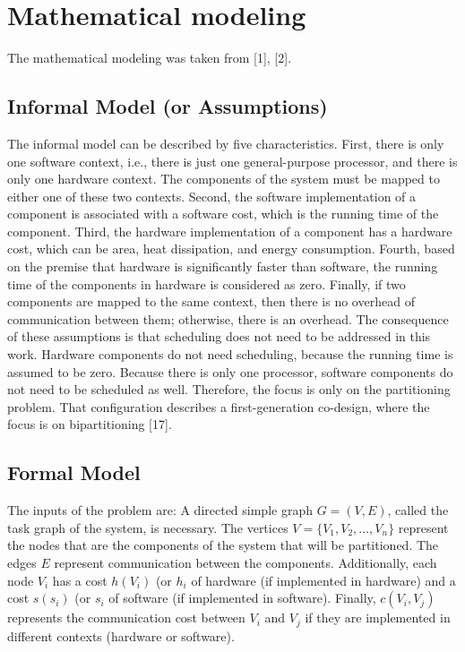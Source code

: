 \section{Mathematical modeling}

The mathematical modeling was taken from [1], [2].

\subsection{Informal Model (or Assumptions)}

The informal model can be described by five characteristics. First, there is only one software context, i.e., there is just one general-purpose processor, and there is only one hardware context. The components of the system must be mapped to either one of these two contexts. Second, the software implementation of a component is associated with a software cost, which is the running time of the component. Third, the hardware implementation of a component has a hardware cost, which can be area, heat dissipation, and energy consumption. Fourth, based on the premise that hardware is significantly faster than software, the running time of the components in hardware is considered as zero. Finally, if two components are mapped to the same context, then there is no overhead of communication between them; otherwise, there is an overhead. The consequence of these assumptions is that scheduling does not need to be addressed in this work. Hardware components do not need scheduling, because the running time is assumed to be zero. Because there is only one processor, software components do not need to be scheduled as well. Therefore, the focus is only on the partitioning problem. That configuration describes a first-generation co-design, where the focus is on bipartitioning [17].

\subsection{Formal Model}

The inputs of the problem are: A directed simple graph $ G = (V,E) $, called the task graph of the system, is necessary. The vertices $ V = \{V_1,V_2,\dotso,V_n\} $ represent the nodes that are the components of the system that will be partitioned. The edges $ E $ represent communication between the components. Additionally, each node  $ V_i $ has a cost $ h(V_i) $ (or $ h_i $ of hardware (if implemented in hardware) and a cost $ s(s_i) $ (or $ s_i $ of software (if implemented in software). Finally, $ c(V_i,V_j) $ represents the communication cost between $ V_i $ and $ V_j $ if they are implemented in different contexts (hardware or software).

